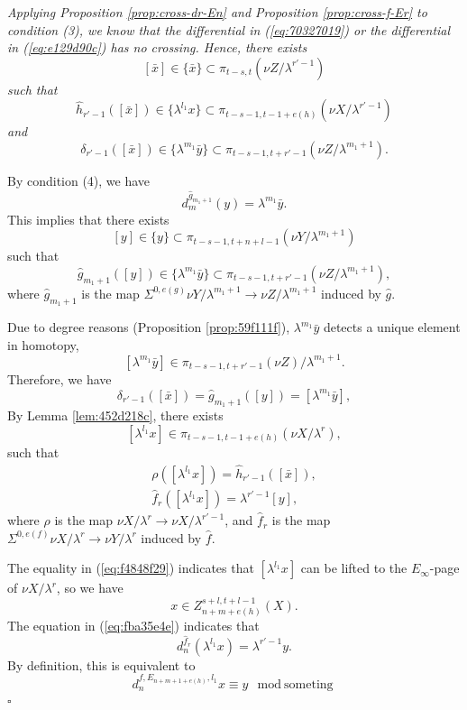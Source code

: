 \documentclass[12pt,a4paper]{article}
\renewenvironment{proof}{{\noindent\it\textbf{Proof}}\quad\it}{\hfill$\square$}
\newcommand{\Sus}{\Sigma}
\begin{document}
\begin{sloppy}
\begin{proof}
    Applying Proposition \ref{prop:cross-dr-En} and Proposition \ref{prop:cross-f-Er} to condition (3), we know that the differential in (\ref{eq:70327019}) or the differential in (\ref{eq:e129d90c}) has no crossing. Hence, there exists
    $$[\bar x]\in \{\bar x\}\subset \pi_{t-s,t}(\nu Z/\lambda^{r'-1})$$
    such that
    $$\hat h_{r'-1}([\bar x])\in \{\lambda^{l_1}x\}\subset \pi_{t-s-1, t-1+e(h)}(\nu X/\lambda^{r'-1})$$
    and
    $$\delta_{r'-1}([\bar x])\in \{\lambda^{m_1}\bar y\}\subset \pi_{t-s-1,t+r'-1}(\nu Z/\lambda^{m_1+1}).$$

    By condition (4), we have
    \begin{equation*}
        d^{\hat g_{m_1+1}}_m(y)=\lambda^{m_1}\bar y.
    \end{equation*}
    This implies that there exists
    $$[y]\in \{y\}\subset \pi_{t-s-1,t+n+l-1}(\nu Y/\lambda^{m_1+1})$$
    such that
    $$\hat g_{m_1+1}([y])\in \{\lambda^{m_1}\bar y\}\subset \pi_{t-s-1, t+r'-1}(\nu Z/\lambda^{m_1+1}),$$
    where $\hat g_{m_1+1}$ is the map $\Sus^{0,e(g)}\nu Y/\lambda^{m_1+1}\to \nu Z/\lambda^{m_1+1}$ induced by $\hat g$.

    Due to degree reasons (Proposition \ref{prop:59f111f}), $\lambda^{m_1}\bar y$ detects a unique element in homotopy,
    $$[\lambda^{m_1}\bar y]\in \pi_{t-s-1, t+r'-1}(\nu Z)/\lambda^{m_1+1}.$$
    Therefore, we have
    $$\delta_{r'-1}([\bar x])=\hat g_{m_1+1}([y])=[\lambda^{m_1}\bar y],$$
    By Lemma \ref{lem:452d218c}, there exists
    $$[\lambda^{l_1}x]\in \pi_{t-s-1,t-1+e(h)}(\nu X/\lambda^r),$$
    such that
    \begin{gather}
        \rho ([\lambda^{l_1}x])=\hat h_{r'-1}([\bar x]),\label{eq:f4848f29}\\
        \hat f_r([\lambda^{l_1}x])=\lambda^{r'-1}[y],\label{eq:fba35e4e}
    \end{gather}
    where $\rho$ is the map $\nu X/\lambda^r\to \nu X/\lambda^{r'-1}$, and $\hat f_r$ is the map $\Sus^{0,e(f)}\nu X/\lambda^r\to \nu Y/\lambda^r$ induced by $\hat f$.

    The equality in (\ref{eq:f4848f29}) indicates that $[\lambda^{l_1}x]$ can be lifted to the $E_\infty$-page of $\nu X/\lambda^r$, so we have
    $$x\in Z_{n+m+e(h)}^{s+l,t+l-1}(X).$$
    The equation in (\ref{eq:fba35e4e}) indicates that
    $$d^{\hat f_r}_n(\lambda^{l_1}x)=\lambda^{r'-1}y.$$
     By definition, this is equivalent to
    $$d^{f, E_{n+m+1+e(h)}, l_1}_nx\equiv y \mod %
    \text{someting}$$
\end{proof}


\end{sloppy}
\end{document}

